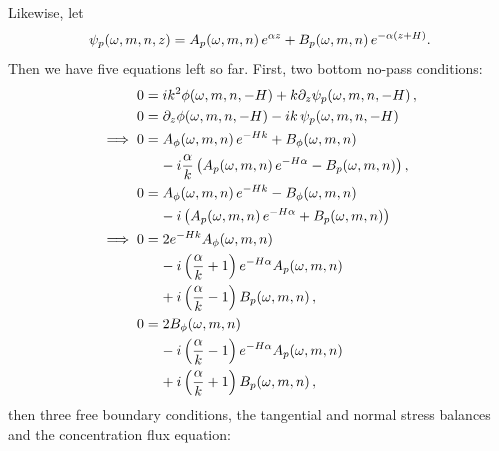 \documentclass[reqno]{amsart}
\numberwithin{equation}{section}
\numberwithin{figure}{section}
\begin{document}
Likewise, let
\begin{equation*}
\psi_{p}\!\left(\omega,m,n,z\right)=A_{p}\!\left(\omega,m,n\right)e^{\alpha z}+B_{p}\!\left(\omega,m,n\right)e^{-\alpha\left(z+H\right)}.
\end{equation*}
Then we have five equations left so far. First, two bottom no-pass conditions:
\begin{align*}
0 &= ik^{2}\vPotential\!\left(\omega,m,n,-\aHeight\right)+k\partial_{z}\vStream_{p}\!\left(\omega,m,n,-\aHeight\right), \\
0 &= \partial_{z}\vPotential\!\left(\omega,m,n,-\aHeight\right)-ik\,\vStream_{p}\!\left(\omega,m,n,-\aHeight\right) \\
\implies
0 &= A_{\vPotential}\!\left(\omega,m,n\right)e^{-\aHeight k}+B_{\vPotential}\!\left(\omega,m,n\right) \\
  &\phantom{=}\,\,-i\frac{\alpha}{k}\left(A_{p}\!\left(\omega,m,n\right)e^{-\aHeight\alpha}-B_{p}\!\left(\omega,m,n\right)\right), \\
0 &= A_{\vPotential}\!\left(\omega,m,n\right)e^{-\aHeight k}-B_{\vPotential}\!\left(\omega,m,n\right) \\
  &\phantom{=}\,\,-i\left(A_{p}\!\left(\omega,m,n\right)e^{-\aHeight\alpha}+B_{p}\!\left(\omega,m,n\right)\right) \\
\implies
0 &= 2e^{-\aHeight k}A_{\vPotential}\!\left(\omega,m,n\right) \\
  &\phantom{=}\,\,-i\left(\frac{\alpha}{k}+1\right)e^{-\aHeight\alpha}A_{p}\!\left(\omega,m,n\right) \\
  &\phantom{=}\,\,+i\left(\frac{\alpha}{k}-1\right)B_{p}\!\left(\omega,m,n\right), \\
0 &= 2B_{\vPotential}\!\left(\omega,m,n\right) \\
  &\phantom{=}\,\,-i\left(\frac{\alpha}{k}-1\right)e^{-\aHeight\alpha}A_{p}\!\left(\omega,m,n\right) \\
  &\phantom{=}\,\,+i\left(\frac{\alpha}{k}+1\right)B_{p}\!\left(\omega,m,n\right),
\end{align*}
then three free boundary conditions, the tangential and normal stress balances and the concentration flux equation:
\end{document}
